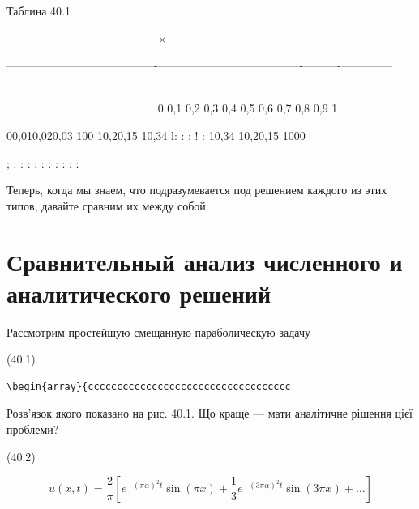 \documentclass[
  ukrainian,
]{article}
\begin{document}
Таблина 40.1

~~~~~~~~~~~~~~~~~~~~~~~~~~\textbar{} × \textbar{} \textbar{} \textbar{}
\textbar{} \textbar{} \textbar{} \textbar{} \textbar{} \textbar{}
\textbar{} \textbar{}

\textbar---------------------------\textbar-------------\textbar------------------\textbar-----------\textbar----------\textbar----------\textbar-----\textbar-----\textbar-----\textbar-----------\textbar------------------\textbar------------------\textbar{}

~~~~~~~~~~~~~~~~~~~~~~~~~~\textbar{} 0 \textbar{} 0,1 \textbar{} 0,2
\textbar{} 0,3 \textbar{} 0,4 \textbar{} 0,5 \textbar{} 0,6 \textbar{}
0,7 \textbar{} 0,8 \textbar{} 0,9 \textbar{} 1 \textbar{}

00,010,020,03 \textbar{} 100 \textbar{} 10,20,15 \textbar{} 10,34
\textbar{} l: \textbar{} : \textbar{} : \textbar{} ! \textbar{} :
\textbar{} 10,34 \textbar{} 10,20,15 \textbar{} 1000 \textbar{}

; \textbar{} \textbar{} : \textbar{} : \textbar{} : \textbar{} :
\textbar{} : \textbar{} : \textbar{} : \textbar{} : \textbar{} :
\textbar{} : \textbar{}

Теперь, когда мы знаем, что подразумевается под решением каждого из этих
типов, давайте сравним их между собой.

\section{\texorpdfstring{\textbf{Сравнительный анализ численного} и
аналитического
решений}{Сравнительный анализ численного и аналитического решений}}\label{ux441ux440ux430ux432ux43dux438ux442ux435ux43bux44cux43dux44bux439-ux430ux43dux430ux43bux438ux437-ux447ux438ux441ux43bux435ux43dux43dux43eux433ux43e-ux438-ux430ux43dux430ux43bux438ux442ux438ux447ux435ux441ux43aux43eux433ux43e-ux440ux435ux448ux435ux43dux438ux439}

Рассмотрим простейшую смещанную параболическую задачу

(40.1)

\begin{verbatim}
\begin{array}{ccccccccccccccccccccccccccccccccccc
\end{verbatim}

Розв'язок якого показано на рис. 40.1. Що краще --- мати аналітичне
рішення цієї проблеми?

(40.2)

\[
u(x, t) = \frac{2}{\pi} \left[ e^{-(\pi\alpha)^2 t} \sin(\pi x) + \frac{1}{3} e^{-(3\pi\alpha)^2 t} \sin(3\pi x) + \dots \right]
\]
\end{document}
